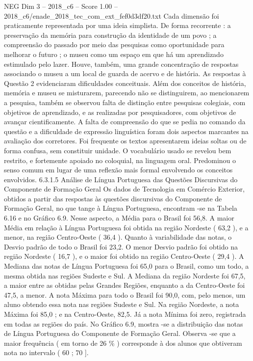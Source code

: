 \begin{textsample}{NEG Dim 3 – 2018\_c6 – Score 1.00 – 2018\_c6/enade\_2018\_tec\_com\_ext\_fef0d3df20.txt}
Cada dimensão foi praticamente representada por uma ideia simplista.
De forma recorrente : a preservação da memória para construção da identidade de um povo ; a compreensão do passado por meio das pesquisas como oportunidade para melhorar o futuro ; o museu como um espaço em que há um aprendizado estimulado pelo lazer.
Houve, também, uma grande concentração de respostas associando o museu a um local de guarda de acervo e de história.
As respostas à Questão 2 evidenciaram dificuldades conceituais.
Além dos conceitos de história, memória e museu se misturarem, parecendo não se distinguirem, ao mencionarem a pesquisa, também se observou falta de distinção entre pesquisas colegiais, com objetivos de aprendizado, e as realizadas por pesquisadores, com objetivos de avançar cientificamente.
A falta de compreensão do que se pedia no comando da questão e a dificuldade de expressão linguística foram dois aspectos marcantes na avaliação dos corretores.
Foi frequente os textos apresentarem ideias soltas ou de forma confusa, sem constituir unidade.
O vocabulário usado se revelou bem restrito, e fortemente apoiado no coloquial, na linguagem oral.
Predominou o senso comum em lugar de uma reflexão mais formal envolvendo os conceitos envolvidos. 6.3.1.5 Análise de Língua Portuguesa das Questões Discursivas do Componente de Formação Geral Os dados de Tecnologia em Comércio Exterior, obtidos a partir das respostas às questões discursivas do Componente de Formação Geral, no que tange à Língua Portuguesa, encontram -se na Tabela 6.16 e no Gráfico 6.9.
Nesse aspecto, a Média para o Brasil foi 56,8.
A maior Média em relação à Língua Portuguesa foi obtida na região Nordeste ( 63,2 ), e a menor, na região Centro-Oeste ( 36,4 ).
Quanto à variabilidade das notas, o Desvio padrão de todo o Brasil foi 23,2.
O menor Desvio padrão foi obtido na região Nordeste ( 16,7 ), e o maior foi obtido na região Centro-Oeste ( 29,4 ).
A Mediana das notas de Língua Portuguesa foi 65,0 para o Brasil, como um todo, a mesma obtida nas regiões Sudeste e Sul.
A Mediana da região Nordeste foi 67,5, a maior entre as obtidas pelas Grandes Regiões, enquanto a da Centro-Oeste foi 47,5, a menor.
A nota Máxima para todo o Brasil foi 90,0, com, pelo menos, um aluno obtendo essa nota nas regiões Sudeste e Sul.
Na região Nordeste, a nota Máxima foi 85,0 ; e na Centro-Oeste, 82,5.
Já a nota Mínima foi zero, registrada em todas as regiões do país.
No Gráfico 6.9, mostra -se a distribuição das notas de Língua Portuguesa do Componente de Formação Geral.
Observa -se que a maior frequência ( em torno de 26 \% ) corresponde à dos alunos que obtiveram nota no intervalo ( 60 ; 70 ].

\end{textsample}
